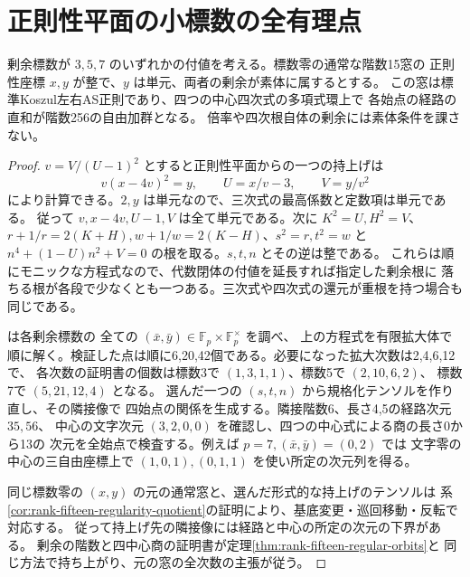 \section{正則性平面の小標数の全有理点}
\label{sec:rank-fifteen-quotient-residues}
\begin{theorem}\label{thm:rank-fifteen-quotient-residues}
剰余標数が $3,5,7$ のいずれかの付値を考える。標数零の通常な階数15窓の
正則性座標 $x,y$ が整で、$y$ は単元、両者の剰余が素体に属するとする。
この窓は標準Koszul左右AS正則であり、四つの中心四次式の多項式環上で
各始点の経路の直和が階数256の自由加群となる。
倍率や四次根自体の剰余には素体条件を課さない。
\end{theorem}
\begin{proof}
$v=V/(U-1)^2$ とすると正則性平面からの一つの持上げは
\[
 v(x-4v)^2=y,\qquad U=x/v-3,\qquad V=y/v^2
\]
により計算できる。$2,y$ は単元なので、三次式の最高係数と定数項は単元である。
従って $v,x-4v,U-1,V$ は全て単元である。次に $K^2=U,H^2=V$、
$r+1/r=2(K+H),w+1/w=2(K-H)$、$s^2=r,t^2=w$ と
$n^4+(1-U)n^2+V=0$ の根を取る。$s,t,n$ とその逆は整である。
これらは順にモニックな方程式なので、代数閉体の付値を延長すれば指定した剰余根に
落ちる根が各段で少なくとも一つある。三次式や四次式の還元が重根を持つ場合も同じである。

 は各剰余標数の
全ての $(\bar x,\bar y)\in\mathbb F_p\times\mathbb F_p^\times$ を調べ、
上の方程式を有限拡大体で順に解く。検証した点は順に6,20,42個である。必要になった拡大次数は2,4,6,12で、
各次数の証明書の個数は標数3で $(1,3,1,1)$、標数5で $(2,10,6,2)$、
標数7で $(5,21,12,4)$ となる。
選んだ一つの $(s,t,n)$ から規格化テンソルを作り直し、その隣接像で
四始点の関係を生成する。隣接階数6、長さ4,5の経路次元 $35,56$、
中心の文字次元 $(3,2,0,0)$ を確認し、四つの中心式による商の長さ0から13の
次元を全始点で検査する。例えば $p=7,(\bar x,\bar y)=(0,2)$ では
文字零の中心の三自由座標上で $(1,0,1),(0,1,1)$ を使い所定の次元列を得る。

同じ標数零の $(x,y)$ の元の通常窓と、選んだ形式的な持上げのテンソルは
系\ref{cor:rank-fifteen-regularity-quotient}の証明により、基底変更・巡回移動・反転で対応する。
従って持上げ先の隣接像には経路と中心の所定の次元の下界がある。
剰余の階数と四中心商の証明書が定理\ref{thm:rank-fifteen-regular-orbits}と
同じ方法で持ち上がり、元の窓の全次数の主張が従う。
\end{proof}
